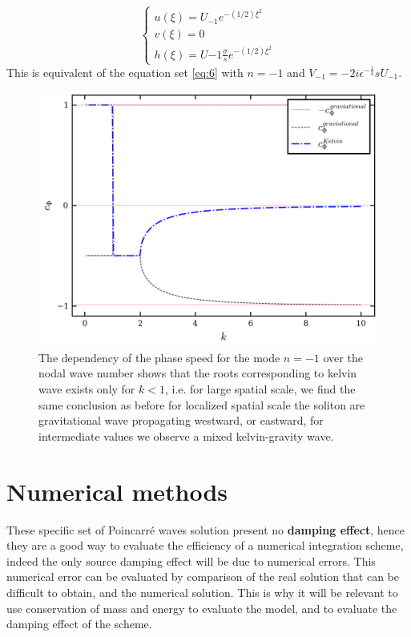 \documentclass[11pt,a4paper]{report}
\begin{document}
\begin{multicols}{2}
    \begin{equation}
        \label{eq:9}
        \begin{cases}
            u(\xi) = U_{-1}e^{-(1/2)\xi^2} \\
            v(\xi) = 0                     \\
            h(\xi) = U{-1}\frac{\sigma}{s}e^{-(1/2)\xi^2}
        \end{cases}
    \end{equation}
    This is equivalent of the equation set \ref{eq:6} with $n=-1$ and $V_{-1} = -2i\epsilon^{-\frac{1}{4}}s U_{-1}$.
    \begin{figure}[H]
        \includegraphics[width=\linewidth]{./figure/roots_k2.png}
        \caption{\footnotesize{The dependency of the phase speed for the mode $n = -1$ over the nodal wave number shows that the roots corresponding to kelvin wave exists only for $k<1$, i.e. for large spatial scale, we find the same conclusion as before
                for localized spatial scale the soliton are gravitational wave propagating westward, or eastward, for intermediate values we observe a mixed kelvin-gravity wave.}}
        \label{fig: Kelvin mode}
    \end{figure}
    \chapter{Numerical methods}
    These specific set of Poincarré waves solution present no \textbf{damping effect}, hence they are a good way to evaluate the efficiency
    of a numerical integration scheme, indeed the only source damping effect will be due to numerical errors. This numerical error can be evaluated by comparison of the real solution that can be difficult to obtain, and the numerical solution.
    This is why it will be relevant to use conservation of mass and energy to evaluate the model, and to evaluate the damping effect of the scheme.

\end{multicols}
\end{document}
